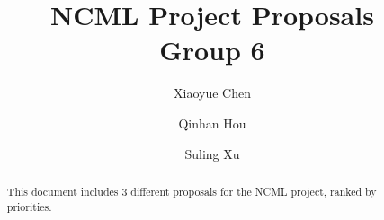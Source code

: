 \documentclass{article}
\title{NCML Project Proposals\\Group 6}
\author{Xiaoyue Chen \and Qinhan Hou \and Suling Xu}
\begin{document}
\maketitle

\begin{abstract}
	This document includes 3 different proposals for the NCML project, ranked by
	priorities.
\end{abstract}





\printbibliography
\end{document}
